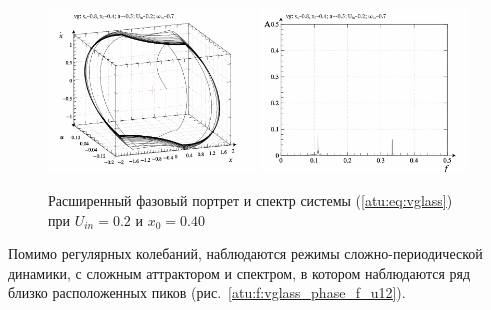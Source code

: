 \begin{figure}[ht!]
\begin{center}
  \includegraphics[width=0.49\textwidth]{p/cha/vg/vg_0-p_phe_0x20_0x70_0x40.png}
  \hfill
  \includegraphics[width=0.49\textwidth]{p/cha/vg/vg_fft-p_f_0x20_0x70_0x40.png}
\end{center}
  \caption{Расширенный фазовый портрет и спектр системы (\ref{atu:eq:vglass}) при $U_{in}=0.2$ и $x_0=0.40$}
\label{atu:f:vglass_phase_f_u11}
\end{figure}

Помимо регулярных колебаний, наблюдаются
режимы сложно-периодической динамики,
с сложным аттрактором и спектром,
в котором наблюдаются ряд близко расположенных пиков
(рис.~\ref{atu:f:vglass_phase_f_u12}).

